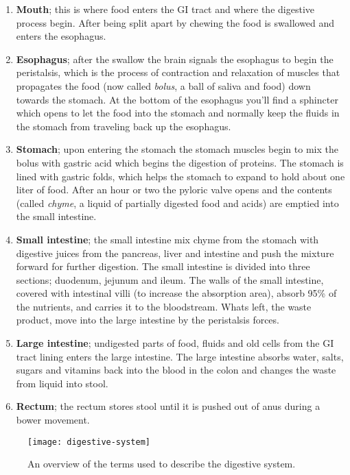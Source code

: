 \documentclass[thesis.tex]{subfiles}
\begin{document}
\begin{enumerate}
\item \textbf{Mouth}; this is where food enters the GI tract and where the digestive process begin. After being split apart by chewing the food is swallowed and enters the esophagus.
\item \textbf{Esophagus}; after the swallow the brain signals the esophagus to begin the peristalsis, which is the process of contraction and relaxation of muscles that propagates the food (now called \textit{bolus}, a ball of saliva and food) down towards the stomach. At the bottom of the esophagus you'll find a sphincter which opens to let the food into the stomach and normally keep the fluids in the stomach from traveling back up the esophagus.
\item \textbf{Stomach}; upon entering the stomach the stomach muscles begin to mix the bolus with gastric acid which begins the digestion of proteins. The stomach is lined with gastric folds, which helps the stomach to expand to hold about one liter of food. After an hour or two the pyloric valve opens and the contents (called \textit{chyme}, a liquid of partially digested food and acids) are emptied into the small intestine.
\item \textbf{Small intestine}; the small intestine mix chyme from the stomach with digestive juices from the pancreas, liver and intestine and push the mixture forward for further digestion. The small intestine is divided into three sections; duodenum, jejunum and ileum. The walls of the small intestine, covered with intestinal villi (to increase the absorption area), absorb 95\% of the nutrients, and carries it to the bloodstream. Whats left, the waste product, move into the large intestine by the peristalsis forces.
\item \textbf{Large intestine}; undigested parts of food, fluids and old cells from the GI tract lining enters the large intestine. The large intestine absorbs water, salts, sugars and vitamins back into the blood in the colon and changes the waste from liquid into stool.
\item \textbf{Rectum}; the rectum stores stool until it is pushed out of anus during a bower movement.
\end{enumerate}


\begin{figure}[ht!] %
  \begin{center}
    \texttt{[image: digestive-system]}
    \caption[An overview of the terms used to describe the digestive system]{An overview of the terms used to describe the digestive system\footnotemark.}
    \label{fig:digestive_system}
  \end{center}
\end{figure}
\end{document}
